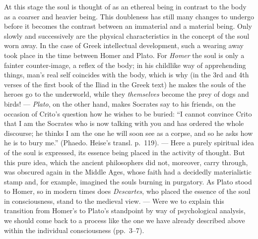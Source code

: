 \documentclass[12pt,a4paper]{book}
\newcommand{\opage}[1]{\marginnote{\footnotesize\textit{[#1]}}}
\begin{document}
\opage{10}At this stage the soul is thought of as an ethereal being in
contrast to the body as a coarser and heavier being. This doubleness has
still many changes to undergo before it becomes the contrast between an
immaterial and a material being. Only slowly and successively are the
physical characteristics in the concept of the soul worn away.
In the case of Greek intellectual development, such a wearing away took
place in the time between Homer and Plato. For \emph{Homer} the soul is
only a fainter counter-image, a reflex of the body; in his childlike way
of apprehending things, man's real self coincides with the body, which
is why (in the 3rd and 4th verses of the first book of the Iliad in the
Greek text) he makes the souls of the heroes go to the underworld, while
they \emph{themselves} become the prey of dogs and birds! --- \emph{Plato}, on
the other hand, makes Socrates say to his friends, on the occasion of
Crito's question how he wishes to be buried: ``I cannot convince Crito
that I am the Socrates who is now talking with you and has ordered the
whole discourse; he thinks I am the one he will soon see as a corpse,
and so he asks how he is to bury me.'' (Phaedo. Heise's transl.
p.~119). --- Here a purely spiritual idea of the soul is expressed, its
essence being placed in the activity of thought. But this pure idea,
which the ancient philosophers did not, moreover, carry through, was
obscured again in the Middle Ages, whose faith had a decidedly
materialistic stamp and, for example, imagined the souls burning in
purgatory. As Plato stood to Homer, so in modern times does
\emph{Descartes}, who placed the essence of the soul in consciousness,
stand to the medieval view. --- Were we to explain this transition from
Homer's to Plato's standpoint by way of psychological analysis, we
should come back to a process like the one we have already described
above within the individual consciousness (pp.~3--7).
\end{document}
